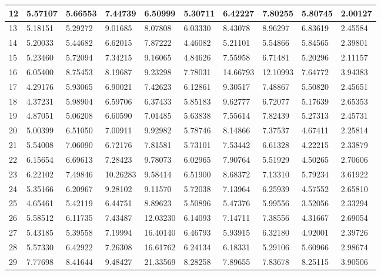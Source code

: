 \begin{table}[H]
{\begin{tabular}{|l|l|l|l|l|l|l|l|l|l|}
        12 & 5.57107 & 5.66553 & 7.44739 & 6.50999 & 5.30711 & 6.42227 & 7.80255 & 5.80745 & 2.00127 \\ \hline
        13 & 5.18151 & 5.29272 & 9.01685 & 8.07808 & 6.03330 & 8.43078 & 8.96297 & 6.83619 & 2.45584 \\ \hline
        14 & 5.20033 & 5.44682 & 6.62015 & 7.87222 & 4.46082 & 5.21101 & 5.54866 & 5.84565 & 2.39801 \\ \hline
        15 & 5.23460 & 5.72094 & 7.34215 & 9.16065 & 4.84626 & 7.55958 & 6.71481 & 5.20296 & 2.11157 \\ \hline
        16 & 6.05400 & 8.75453 & 8.19687 & 9.23298 & 7.78031 & 14.66793 & 12.10993 & 7.64772 & 3.94383 \\ \hline
        17 & 4.29176 & 5.93065 & 6.90021 & 7.42623 & 6.12861 & 9.30517 & 7.48867 & 5.50820 & 2.45651 \\ \hline
        18 & 4.37231 & 5.98904 & 6.59706 & 6.37433 & 5.85183 & 9.62777 & 6.72077 & 5.17639 & 2.65353 \\ \hline
        19 & 4.87051 & 5.06208 & 6.60590 & 7.01485 & 5.63838 & 7.55614 & 7.82439 & 5.27313 & 2.45731 \\ \hline
        20 & 5.00399 & 6.51050 & 7.00911 & 9.92982 & 5.78746 & 8.14866 & 7.37537 & 4.67411 & 2.25814 \\ \hline
        21 & 5.54008 & 7.06090 & 6.72176 & 7.81581 & 5.73101 & 7.53442 & 6.61328 & 4.22215 & 2.33879 \\ \hline
        22 & 6.15654 & 6.69613 & 7.28423 & 9.78073 & 6.02965 & 7.90764 & 5.51929 & 4.50265 & 2.70606 \\ \hline
        23 & 6.22102 & 7.49846 & 10.26283 & 9.58414 & 6.51900 & 8.68372 & 7.13310 & 5.79234 & 3.61922 \\ \hline
        24 & 5.35166 & 6.20967 & 9.28102 & 9.11570 & 5.72038 & 7.13964 & 6.25939 & 4.57552 & 2.65810 \\ \hline
        25 & 4.65461 & 5.42119 & 6.44751 & 8.89623 & 5.50896 & 5.47376 & 5.99556 & 3.52056 & 2.33294 \\ \hline
        26 & 5.58512 & 6.11735 & 7.43487 & 12.03230 & 6.14093 & 7.14711 & 7.38556 & 4.31667 & 2.69054 \\ \hline
        27 & 5.43185 & 5.39558 & 7.19994 & 16.40140 & 6.46793 & 5.93915 & 6.32180 & 4.92001 & 2.39726 \\ \hline
        28 & 5.57330 & 6.42922 & 7.26308 & 16.61762 & 6.24134 & 6.18331 & 5.29106 & 5.60966 & 2.98674 \\ \hline
        29 & 7.77698 & 8.41644 & 9.48427 & 21.33569 & 8.28258 & 7.89655 & 7.83678 & 8.25115 & 3.90506 \\ \hline

\end{tabular}}
\end{table}
